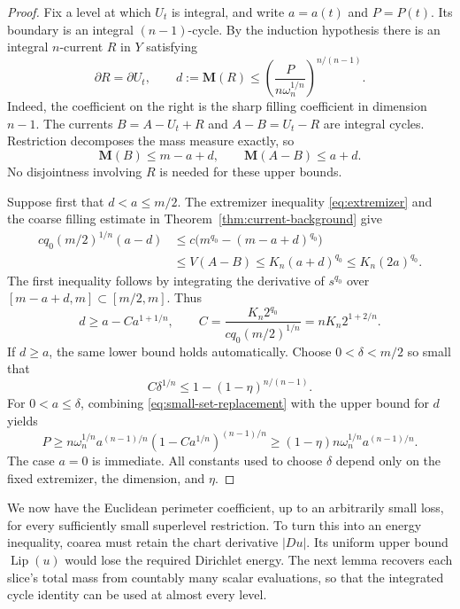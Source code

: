 \documentclass[11pt]{article}
\numberwithin{equation}{section}
\theoremstyle{definition}
\theoremstyle{remark}
\begin{document}
\begin{proof}
Fix a level at which $U_t$ is integral, and write $a=a(t)$ and $P=P(t)$.
Its boundary is an integral $(n-1)$-cycle.  By the induction hypothesis
there is an integral $n$-current $R$ in $Y$ satisfying
\[
 \partial R=\partial U_t,\qquad
 d:=\mathbf M(R)\le
 \left(\frac{P}{n\omega_n^{1/n}}\right)^{n/(n-1)}.
\]
Indeed, the coefficient on the right is the sharp filling coefficient
in dimension $n-1$.  The currents $B=A-U_t+R$ and $A-B=U_t-R$ are
integral cycles.  Restriction decomposes the mass measure exactly, so
\[
 \mathbf M(B)\le m-a+d,\qquad \mathbf M(A-B)\le a+d.
\]
No disjointness involving $R$ is needed for these upper bounds.

Suppose first that $d<a\le m/2$.  The extremizer inequality
\eqref{eq:extremizer} and the coarse filling estimate in
Theorem~\ref{thm:current-background} give
\begin{align*}
 cq_0(m/2)^{1/n}(a-d)
 &\le c\bigl(m^{q_0}-(m-a+d)^{q_0}\bigr)\\
 &\le V(A-B)
 \le K_n(a+d)^{q_0}
 \le K_n(2a)^{q_0}.
\end{align*}
The first inequality follows by integrating the derivative of
$s^{q_0}$ over $[m-a+d,m]\subset[m/2,m]$.  Thus
\begin{equation}
 d\ge a-Ca^{1+1/n},\qquad
 C=\frac{K_n2^{q_0}}{cq_0(m/2)^{1/n}}
   =nK_n2^{1+2/n}.
 \label{eq:small-set-replacement}
\end{equation}
If $d\ge a$, the same lower bound holds automatically.  Choose
$0<\delta<m/2$ so small that
\[
 C\delta^{1/n}\le1-(1-\eta)^{n/(n-1)}.
\]
For $0<a\le\delta$, combining \eqref{eq:small-set-replacement} with the
upper bound for $d$ yields
\[
 P\ge n\omega_n^{1/n}a^{(n-1)/n}
           (1-Ca^{1/n})^{(n-1)/n}
   \ge (1-\eta)n\omega_n^{1/n}a^{(n-1)/n}.
\]
The case $a=0$ is immediate.  All constants used to choose $\delta$
depend only on the fixed extremizer, the dimension, and $\eta$.
\end{proof}

We now have the Euclidean perimeter coefficient, up to an arbitrarily
small loss, for every sufficiently small superlevel restriction. To turn
this into an energy inequality, coarea must retain the chart derivative
$|Du|$. Its uniform upper bound $\operatorname{Lip}(u)$ would lose the required
Dirichlet energy. The next lemma recovers each slice's total mass from
countably many scalar evaluations, so that the integrated cycle identity
can be used at almost every level.
\end{document}
